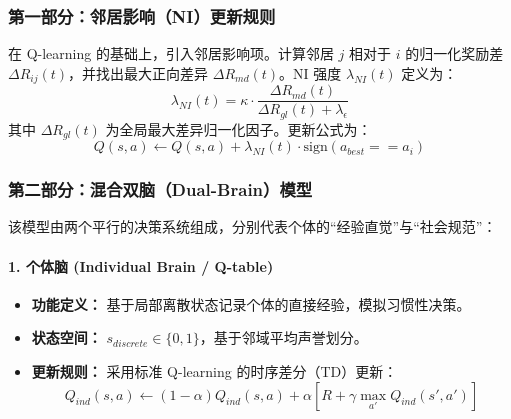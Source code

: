 \documentclass[UTF8,a4paper,12pt]{ctexart}
\begin{document}
\subsubsection{第一部分：邻居影响（NI）更新规则}
在 Q-learning 的基础上，引入邻居影响项。计算邻居 $j$ 相对于 $i$ 的归一化奖励差 $\Delta R_{ij}(t)$，并找出最大正向差异 $\Delta R_{md}(t)$。NI 强度 $\lambda_{NI}(t)$ 定义为：
\begin{equation}
\lambda_{NI}(t) = \kappa \cdot \frac{\Delta R_{md}(t)}{\Delta R_{gl}(t) + \lambda_{\epsilon}}
\end{equation}
其中 $\Delta R_{gl}(t)$ 为全局最大差异归一化因子。更新公式为：
\begin{equation}
Q(s, a) \leftarrow Q(s, a) + \lambda_{NI}(t) \cdot \text{sign}(a_{best} == a_i)
\end{equation}

\subsubsection{第二部分：混合双脑（Dual-Brain）模型}
该模型由两个平行的决策系统组成，分别代表个体的“经验直觉”与“社会规范”：

\paragraph{1. 个体脑 (Individual Brain / Q-table)}
\begin{itemize}
    \item \textbf{功能定义：} 基于局部离散状态记录个体的直接经验，模拟习惯性决策。
    \item \textbf{状态空间：} $s_{discrete} \in \{0, 1\}$，基于邻域平均声誉划分。
    \item \textbf{更新规则：} 采用标准 Q-learning 的时序差分（TD）更新：
    \begin{equation}
    Q_{ind}(s, a) \leftarrow (1 - \alpha) Q_{ind}(s, a) + \alpha \left[ R + \gamma \max_{a'} Q_{ind}(s', a') \right]
    \end{equation}
\end{itemize}
\end{document}
